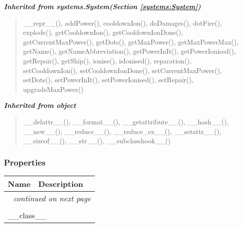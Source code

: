 \large{\textbf{\textit{Inherited from systems.System\textit{(Section \ref{systems:System})}}}}

\begin{quote}
\_\_repr\_\_(), addPower(), cooldownIon(), doDamages(), dotFire(), explode(), getCooldownIon(), getCooldownIonDone(), getCurrentMaxPower(), getDots(), getMaxPower(), getMaxPowerMax(), getName(), getNameAbbreviation(), getPowerInIt(), getPowerIonised(), getRepair(), getShip(), ionise(), isIonised(), reparation(), setCooldownIon(), setCooldownIonDone(), setCurrentMaxPower(), setDots(), setPowerInIt(), setPowerIonised(), setRepair(), upgradeMaxPower()
\end{quote}

\large{\textbf{\textit{Inherited from object}}}

\begin{quote}
\_\_delattr\_\_(), \_\_format\_\_(), \_\_getattribute\_\_(), \_\_hash\_\_(), \_\_new\_\_(), \_\_reduce\_\_(), \_\_reduce\_ex\_\_(), \_\_setattr\_\_(), \_\_sizeof\_\_(), \_\_str\_\_(), \_\_subclasshook\_\_()
\end{quote}


  \subsubsection{Properties}

    \vspace{-1cm}
\hspace{\varindent}\begin{longtable}{|p{\varnamewidth}|p{\vardescrwidth}|l}
\cline{1-2}
\cline{1-2} \centering \textbf{Name} & \centering \textbf{Description}& \\
\cline{1-2}
\endhead\cline{1-2}\multicolumn{3}{r}{\small\textit{continued on next page}}\\\endfoot\cline{1-2}
\endlastfoot\multicolumn{2}{|l|}{\textit{Inherited from object}}\\
\multicolumn{2}{|p{\varwidth}|}{\raggedright \_\_class\_\_}\\
\cline{1-2}
\end{longtable}


